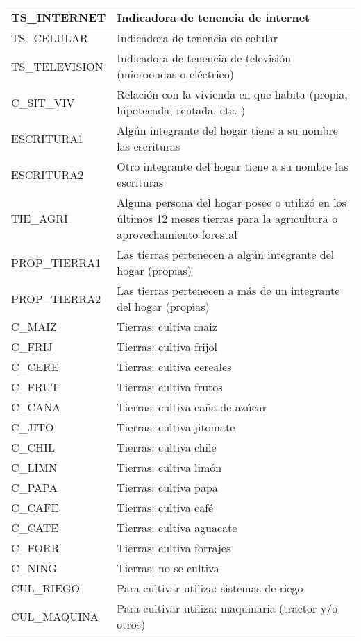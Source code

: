 \begin{longtable}{|p{8cm}|p{8cm}|}
    \hline
    TS\_INTERNET & Indicadora de tenencia de internet\\
    \hline
    TS\_CELULAR & Indicadora de tenencia de celular\\
    \hline
    TS\_TELEVISION & Indicadora de tenencia de televisión (microondas o eléctrico) \\
    \hline
    C\_SIT\_VIV & Relación con la vivienda en que habita (propia, hipotecada, rentada, etc. ) \\
    \hline
    ESCRITURA1 & Algún integrante del hogar tiene a su nombre las escrituras \\
    \hline
    ESCRITURA2 & Otro integrante del hogar tiene a su nombre las escrituras \\
    \hline
    TIE\_AGRI & Alguna persona del hogar posee o utilizó en los últimos 12 meses tierras para la agricultura o aprovechamiento forestal \\
    \hline
    PROP\_TIERRA1 & Las tierras pertenecen a algún integrante del hogar (propias) \\
    \hline
    PROP\_TIERRA2 & Las tierras pertenecen a más de un integrante del hogar (propias) \\
    \hline
    C\_MAIZ & Tierras: cultiva maiz \\
    \hline
    C\_FRIJ & Tierras: cultiva frijol \\
    \hline
    C\_CERE & Tierras: cultiva cereales \\
    \hline
    C\_FRUT & Tierras: cultiva frutos \\
    \hline
    C\_CANA & Tierras: cultiva caña de azúcar \\
    \hline
    C\_JITO & Tierras: cultiva jitomate \\
    \hline
    C\_CHIL & Tierras: cultiva chile \\
    \hline
    C\_LIMN & Tierras: cultiva limón \\
    \hline
    C\_PAPA & Tierras: cultiva papa \\
    \hline
    C\_CAFE & Tierras: cultiva café \\
    \hline
    C\_CATE & Tierras: cultiva aguacate \\
    \hline
    C\_FORR & Tierras: cultiva forrajes \\
    \hline
    C\_NING & Tierras: no se cultiva \\
    \hline
    CUL\_RIEGO & Para cultivar utiliza: sistemas de riego \\
    \hline
    CUL\_MAQUINA & Para cultivar utiliza: maquinaria (tractor y/o otros)\\

\end{longtable}
